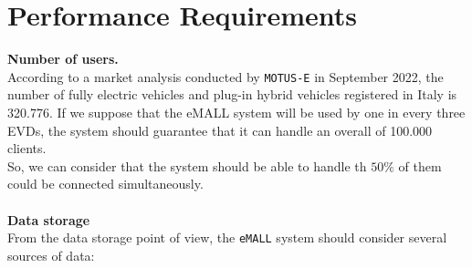\section{Performance Requirements}
\label{sec:performance_requirements}%
\textbf{Number of users.} \\
According to a market analysis conducted by \verb|MOTUS-E| in September 2022,
the number of fully electric vehicles and plug-in hybrid vehicles registered in Italy is 320.776.
If we suppose that the eMALL system will be used by one in every three EVDs,
the system should guarantee that it can handle an overall of 100.000 clients. \\
So, we can consider that the system should be able to handle th $50\%$ of them could be connected simultaneously. \\
\\
\textbf{Data storage} \\
From the data storage point of view, the \verb|eMALL| system should consider several sources of data:
